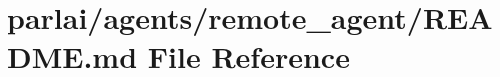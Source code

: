 \hypertarget{parlai_2agents_2remote__agent_2README_8md}{}\section{parlai/agents/remote\+\_\+agent/\+R\+E\+A\+D\+ME.md File Reference}
\label{parlai_2agents_2remote__agent_2README_8md}
